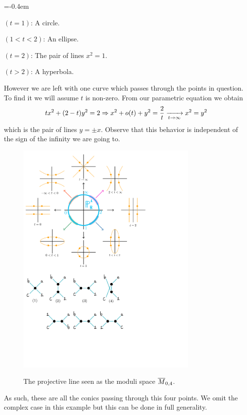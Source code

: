 \documentclass[12pt]{memoir}
\begin{document}
\begin{Ex}
    \vspace{-0.5em}
    \begin{itemize}
        \begin{multicols}{2}
            \itemsep=-0.4em
        \item $(t=1)$: A circle.
        \item $(1<t<2)$: An ellipse.
        \item $(t=2)$: The pair of lines $x^2=1$.
        \item $(t>2)$: A hyperbola.
        \end{multicols}
    \end{itemize}
    However we are left with one curve which passes through the points in question. To find it we will assume $t$ is non-zero. From our parametric equation we obtain 
    $$tx^2+(2-t)y^2=2\Rightarrow x^2+o(t)+y^2=\frac{2}{t}\xrightarrow[t\to\infty]{}x^2=y^2$$
    which is the pair of lines $y=\pm x$. Observe that this behavior is independent of the sign of the infinity we are going to. 
    \begin{figure}[h!]
        \centering
        \includegraphics[width=0.8\textwidth, trim= 0.25cm 13.1cm 5.25cm 0.5cm,clip]{Figs/fig2Intro.pdf}
        \label{fig2intro}
        \caption{The projective line seen as the moduli space $\overline M_{0,4}$.}
    \end{figure}
    As such, these are all the conics passing through this four points. We omit the complex case in this example but this can be done in full generality.
\end{Ex}
   
\end{document}
